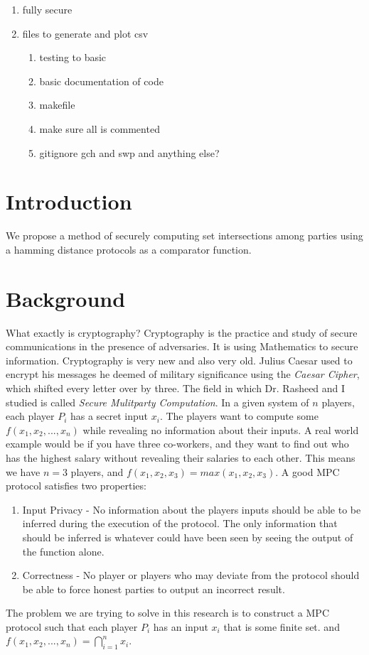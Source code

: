 \documentclass[10pt]{article}
\begin{document}
\begin{enumerate}
\begin{enumerate}
	\item fully secure
	\item files to generate and plot csv
		\begin{enumerate}
		\item testing to basic
		\item basic documentation of code
		\item makefile
		\item make sure all is commented
		\item gitignore gch and swp and anything else?
		\end{enumerate}
	\end{enumerate}
\end{enumerate}

\newpage

\section{Introduction}
We propose a method of securely computing set intersections among parties using a hamming distance protocols as a comparator function. 
\section{Background}

What exactly is cryptography? Cryptography is the practice and study of secure communications in the presence of adversaries. It is using Mathematics to secure information. Cryptography is very new and also very old. Julius Caesar used to encrypt his messages he deemed of military significance using the \textit{Caesar Cipher}, which shifted every letter over by three. The field in which Dr. Rasheed and I studied is called \textit{Secure Mulitparty Computation}. In a given system of $n$ players, each player $P_i$ has a secret input $x_i$. The players want to compute some $f(x_1,x_2,...,x_n)$ while revealing no information about their inputs. A real world example would be if you have three co-workers, and they want to find out who has the highest salary without revealing their salaries to each other. This means we have $n=3$ players, and $f(x_1,x_2,x_3) = max(x_1,x_2,x_3)$. A good MPC protocol satisfies two properties:
\begin{enumerate}
\item Input Privacy - No information about the players inputs should be able to be inferred during the execution of the protocol. The only information that should be inferred is whatever could have been seen by seeing the output of the function alone.
\item Correctness - No player or players who may deviate from the protocol should be able to force honest parties to output an incorrect result.  
\end{enumerate} 
The problem we are trying to solve in this research is to construct a MPC protocol such that each player $P_i$ has an input $x_i$ that is some finite set. and $f(x_1,x_2,...,x_n) = \bigcap_{i=1}^n x_i$. 
\end{document}
